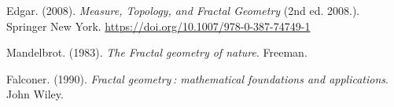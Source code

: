 \begin{thebibliography}{99}
    
 Edgar. (2008). \textit{Measure, Topology, and Fractal Geometry} (2nd ed. 2008.). Springer New York. \url{https://doi.org/10.1007/978-0-387-74749-1}

 Mandelbrot. (1983). \textit{The Fractal geometry of nature}. Freeman.

 Falconer. (1990). \textit{Fractal geometry : mathematical foundations and applications}. John Wiley.


\end{thebibliography}